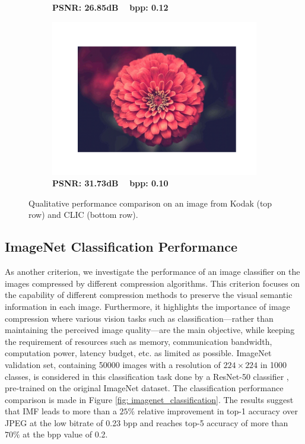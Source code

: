 \begin{figure}[t]
\begin{subfigure}{.23\textwidth}
		\vspace{-20pt}
		\caption*{\tiny \textbf{PSNR: 26.85dB ~ bpp: 0.12}}
	\end{subfigure}
	\begin{subfigure}{.23\textwidth}
		\centering
		\includegraphics[trim=1.7cm 1.5cm 1.7cm 1.7cm, clip, width=1\textwidth]{figures/clic_flower_IMF - YCbCr_bpp_0.108.pdf}
		\vspace{-20pt}
		\caption*{\tiny \textbf{PSNR: 31.73dB ~ bpp: 0.10}}
	\end{subfigure}
	
	\caption{Qualitative performance comparison on an image from Kodak (top row) and CLIC (bottom row).}
	\label{fig:qualitative_comparison}
\end{figure}


\subsection{ImageNet Classification Performance} \label{sec: imagenet Classification Performance}
As another criterion, we investigate the performance of an image classifier on the images compressed by different compression algorithms. 
This criterion focuses on the capability of different compression methods to preserve the visual semantic information in each image.
Furthermore, it highlights the importance of image compression where various vision tasks such as classification---rather than maintaining the perceived image quality---are the main objective, while keeping the requirement of resources such as memory, communication bandwidth, computation power, latency budget, etc. as limited as possible.
ImageNet \cite{deng2009imagenet} validation set, containing 50000 images with a resolution of $224 \times 224$ in 1000 classes, is considered in this classification task done by a ResNet-50 classifier \cite{he2016deep}, pre-trained on the original ImageNet dataset.
The classification performance comparison is made in Figure \ref{fig: imagenet_classification}. 
The results suggest that IMF leads to more than a $25\%$ relative improvement in top-1 accuracy over JPEG at the low bitrate of 0.23 bpp and reaches top-5 accuracy of more than $70\%$ at the bpp value of 0.2. 


